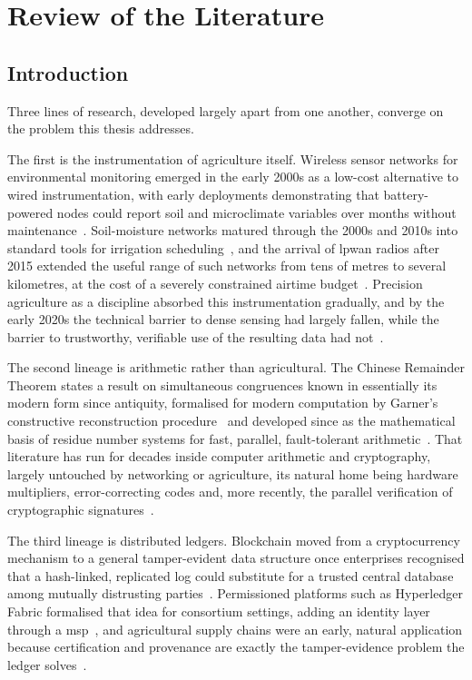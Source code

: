 \documentclass[12pt,a4paper,oneside]{book}
\begin{document}
\chapter{Review of the Literature}
\label{ch:literature}

\section{Introduction}
\label{sec:lit_history}

Three lines of research, developed largely apart from one another, converge on
the problem this thesis addresses.

The first is the instrumentation of agriculture itself. Wireless sensor
networks for environmental monitoring emerged in the early 2000s as a
low-cost alternative to wired instrumentation, with early deployments
demonstrating that battery-powered nodes could report soil and microclimate
variables over months without maintenance~\cite{wang2006wireless,
pierce1999site}. Soil-moisture networks matured through the 2000s and 2010s
into standard tools for irrigation scheduling~\cite{bogena2010soil,
evans2008precision}, and the arrival of \gls{lpwan} radios after 2015
extended the useful range of such networks from tens of metres to several
kilometres, at the cost of a severely constrained airtime
budget~\cite{adelantado2017understanding, raj2017comprehensive}. Precision
agriculture as a discipline absorbed this instrumentation gradually, and by
the early 2020s the technical barrier to dense sensing had largely fallen,
while the barrier to trustworthy, verifiable use of the resulting data had
not~\cite{mcbratney2005future, aydin2021comprehensive}.

The second lineage is arithmetic rather than agricultural. The Chinese
Remainder Theorem states a result on simultaneous congruences known in
essentially its modern form since antiquity, formalised for modern
computation by Garner's constructive reconstruction
procedure~\cite{garner1959residue} and developed since as the mathematical
basis of residue number systems for fast, parallel, fault-tolerant
arithmetic~\cite{ding1996remainder, parhami2010computer}. That literature
has run for decades inside computer arithmetic and cryptography, largely
untouched by networking or agriculture, its natural home being hardware
multipliers, error-correcting codes and, more recently, the parallel
verification of cryptographic
signatures~\cite{knuth1997art,hardy2008introduction,shoup2009computational}.

The third lineage is distributed ledgers. Blockchain moved from a
cryptocurrency mechanism to a general tamper-evident data structure once
enterprises recognised that a hash-linked, replicated log could substitute
for a trusted central database among mutually
distrusting parties~\cite{christidis2016blockchain, gubbi2013internet}.
Permissioned platforms such as Hyperledger Fabric formalised that idea for
consortium settings, adding an identity layer through a
\gls{msp}~\cite{jayaram2023hyperledger, hyperledger2022msp}, and agricultural
supply chains were an early, natural application because certification and
provenance are exactly the tamper-evidence problem the ledger
solves~\cite{tian2016agri, xu2016blockchain, salah2019blockchain}.
\end{document}
